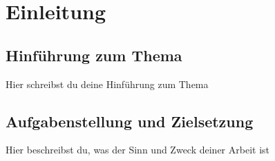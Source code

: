 \newpage
\section{Einleitung}
\subsection{Hinführung zum Thema}
    Hier schreibst du deine Hinführung zum Thema
    
\subsection{Aufgabenstellung und Zielsetzung}
    Hier beschreibst du, was der Sinn und Zweck deiner Arbeit ist
    

    